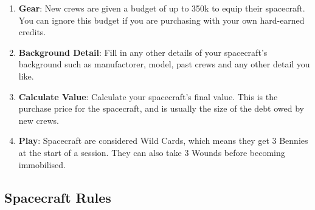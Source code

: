 \begin{multicols}{2}
\begin{enumerate}
  \item \textbf{Gear}: New crews are given a budget of up to 350k to equip their spacecraft. You can ignore this budget if you are purchasing with your own hard-earned credits.

  \item \textbf{Background Detail}: Fill in any other details of your spacecraft's background such as manufactorer, model, past crews and any other detail you like.
  
  \item \textbf{Calculate Value}: Calculate your spacecraft's final value. This is the purchase price for the spacecraft, and is usually the size of the debt owed by new crews.
  
  \item \textbf{Play}: Spacecraft are considered Wild Cards, which means they get 3 Bennies at the start of a session. They can also take 3 Wounds before becoming immobilised.

\end{enumerate}

\subsection{Spacecraft Rules}


\end{multicols}
